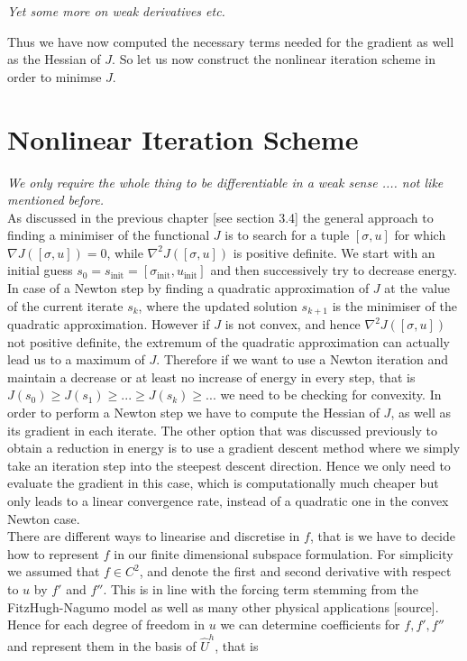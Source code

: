 \documentclass[../draft_1.tex]{subfiles}
\begin{document}
\textit{Yet some more on weak derivatives etc.}

Thus we have now computed the necessary terms needed for the gradient as well as the Hessian of $J$. So let us now construct the nonlinear iteration scheme in order to minimse $J$. 


\section{Nonlinear Iteration Scheme}
\textit{We only require the whole thing to be differentiable in a weak sense .... not like mentioned before.} 
\smallskip
\\
As discussed in the previous chapter [see section 3.4] the general approach to finding a minimiser of the functional $J$ is to search for a tuple $[\sigma, u]$ for which $\nabla  J ([\sigma, u])= 0$, while $\nabla^2 J ([\sigma, u]) $ is positive definite. We start with an initial guess $s_0 = s_{\text{init}} = [\sigma_{\text{init}}, u_{\text{init}}]$ and then successively try to decrease energy. In case of a Newton step by finding a quadratic approximation of $J$ at the value of the current iterate $s_k$, where the updated solution $s_{k+1}$ is the minimiser of the quadratic approximation. However if $J$ is not convex, and hence $\nabla^2 J ([\sigma, u]) $ not positive definite, the extremum of the quadratic approximation can actually lead us to a maximum of $J$. Therefore if we want to use a Newton iteration and maintain a decrease or at least no increase of energy in every step, that is $J(s_0) \geq J(s_1) \geq ... \geq J(s_k) \geq ... $ we need to be checking for convexity. In order to perform a Newton step we have to compute the Hessian of $J$, as well as its gradient in each iterate. The other option that was discussed previously to obtain a reduction in energy is to use a gradient descent method where we simply take an iteration step into the steepest descent direction. Hence we only need to evaluate the gradient in this case, which is computationally much cheaper but only leads to a linear convergence rate, instead of a quadratic one in the convex Newton case. 
\smallskip
\\
There are different ways to linearise and discretise in $f$, that is we have to decide how to represent $f$ in our finite dimensional subspace formulation. For simplicity we assumed that $f \in C^2$, and denote the first and second derivative with respect to $u$ by $f'$ and $f''$. This is in line with the forcing term stemming from the FitzHugh-Nagumo model as well as many other physical applications [source]. Hence for each degree of freedom in $u$ we can determine coefficients for $f, f', f''$ and represent them in the basis of $\hat{U}^h$, that is 
\end{document}
